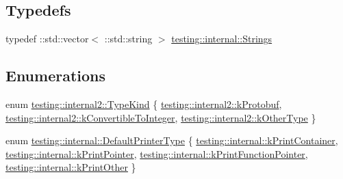 \subsection*{Typedefs}
\begin{DoxyCompactItemize}
\item 
typedef \+::std\+::vector$<$ \+::std\+::string $>$ \mbox{\hyperlink{namespacetesting_1_1internal_a50003bb76ec2934be1062be11efba8bf}{testing\+::internal\+::\+Strings}}
\end{DoxyCompactItemize}
\subsection*{Enumerations}
\begin{DoxyCompactItemize}
\item 
enum \mbox{\hyperlink{namespacetesting_1_1internal2_aeb8161b0b3ee503347b0662d7028fd57}{testing\+::internal2\+::\+Type\+Kind}} \{ \mbox{\hyperlink{namespacetesting_1_1internal2_aeb8161b0b3ee503347b0662d7028fd57a14aaf98a2547ecf43eef0868d54b1383}{testing\+::internal2\+::k\+Protobuf}}, 
\mbox{\hyperlink{namespacetesting_1_1internal2_aeb8161b0b3ee503347b0662d7028fd57a9bdcf3f1548f498b2b7f097306ea0224}{testing\+::internal2\+::k\+Convertible\+To\+Integer}}, 
\mbox{\hyperlink{namespacetesting_1_1internal2_aeb8161b0b3ee503347b0662d7028fd57abe8aaea44751d6ebd0cdf5bd94451db1}{testing\+::internal2\+::k\+Other\+Type}}
 \}
\item 
enum \mbox{\hyperlink{namespacetesting_1_1internal_a17fb8f0125fa92404a249ed38a43faa4}{testing\+::internal\+::\+Default\+Printer\+Type}} \{ \mbox{\hyperlink{namespacetesting_1_1internal_a17fb8f0125fa92404a249ed38a43faa4a945a19e59155ce1d335e8c3bcbdf61db}{testing\+::internal\+::k\+Print\+Container}}, 
\mbox{\hyperlink{namespacetesting_1_1internal_a17fb8f0125fa92404a249ed38a43faa4a8eaa6fff4a58832b30027df49f73dcbf}{testing\+::internal\+::k\+Print\+Pointer}}, 
\mbox{\hyperlink{namespacetesting_1_1internal_a17fb8f0125fa92404a249ed38a43faa4a5a066cde30e276c6460ba10d123d0c2c}{testing\+::internal\+::k\+Print\+Function\+Pointer}}, 
\mbox{\hyperlink{namespacetesting_1_1internal_a17fb8f0125fa92404a249ed38a43faa4a6f88d77d9d763d8a009caf950cfbab28}{testing\+::internal\+::k\+Print\+Other}}
 \}
\end{DoxyCompactItemize}
